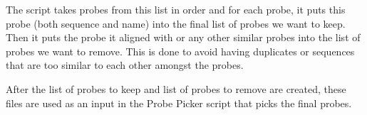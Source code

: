 The script takes probes from this list in order and for each probe, it puts this probe (both sequence and name) into the final list of probes we want to keep. Then it puts the probe it aligned with or any other 
similar probes into the list of probes we want to remove. This is done to avoid having duplicates or sequences that are too similar to each other amongst the probes. 

After the list of probes to keep and list of probes to remove are created, these files are used as an input in the Probe Picker script that picks the final probes. 


